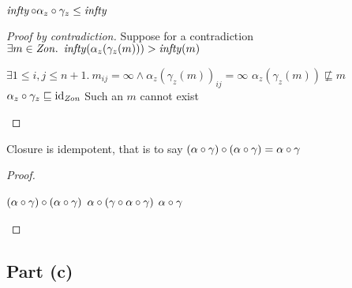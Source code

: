 \begin{lemma}\label{lemma:infty-closure}
  $\operatorname{\mathit{infty}}\circ\alpha_z\circ\gamma_z\leq\operatorname{\mathit{infty}}$
  \begin{proof}[Proof by contradiction]
    Suppose for a contradiction ${\exists m\in\mathit{Zon}.~\operatorname{\mathit{infty}}(\alpha_z(\gamma_z(m))) > \operatorname{\mathit{infty}}(m)}$
    \begin{itemize}
      \step[\imps] $\exists1\leq i, j\leq n+1.~m_{ij}=\infty\wedge\alpha_z(\gamma_z(m))_{ij} = \infty$
      \step[\imps] $\alpha_z(\gamma_z(m))\not\sqsubseteq m$
      \step[\contras] $\alpha_z\circ\gamma_z\sqsubseteq\operatorname{id}_{\mathit{Zon}}$
      \step[\imps] Such an $m$ cannot exist\qedhere
    \end{itemize}
  \end{proof}
\end{lemma}

\begin{lemma}\label{lemma:closure-idemp}
  Closure is idempotent, that is to say
  ${(\alpha\circ\gamma)\circ(\alpha\circ\gamma) = \alpha\circ\gamma}$
  \begin{proof}~\\
    \begin{itemize}
      \step $(\alpha\circ\gamma)\circ(\alpha\circ\gamma)$
      \step[=] $\alpha\circ(\gamma\circ\alpha\circ\gamma)$
      \step[=] $\alpha\circ\gamma$\qedhere
    \end{itemize}
  \end{proof}
\end{lemma}

\subsection{Part (c)}\label{sec:q-1-c}


